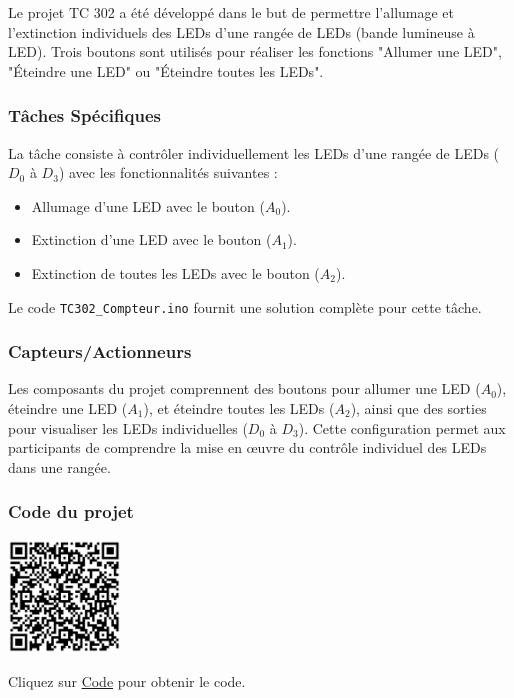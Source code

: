 \documentclass[a4paper,12pt]{report}
\begin{document}
Le projet TC 302 a été développé dans le but de permettre l'allumage et l'extinction individuels des LEDs d'une rangée de LEDs (bande lumineuse à LED). Trois boutons sont utilisés pour réaliser les fonctions "Allumer une LED", "Éteindre une LED" ou "Éteindre toutes les LEDs".

\subsubsection{Tâches Spécifiques}

La tâche consiste à contrôler individuellement les LEDs d'une rangée de LEDs (\(D_0\) à \(D_3\)) avec les fonctionnalités suivantes :
\begin{itemize}
    \item Allumage d'une LED avec le bouton (\(A_0\)).
    \item Extinction d'une LED avec le bouton (\(A_1\)).
    \item Extinction de toutes les LEDs avec le bouton (\(A_2\)).
\end{itemize}
Le code \texttt{TC302\_Compteur.ino} fournit une solution complète pour cette tâche.

\subsubsection{Capteurs/Actionneurs}

Les composants du projet comprennent des boutons pour allumer une LED (\(A_0\)), éteindre une LED (\(A_1\)), et éteindre toutes les LEDs (\(A_2\)), ainsi que des sorties pour visualiser les LEDs individuelles (\(D_0\) à \(D_3\)). Cette configuration permet aux participants de comprendre la mise en œuvre du contrôle individuel des LEDs dans une rangée.

\subsubsection{Code du projet}

\begin{minipage}{0.5\textwidth}
    \includegraphics[height=3cm]{Code TC202.png}
\end{minipage}%
\begin{minipage}{0.5\textwidth}
    Cliquez sur \href{https://github.com/DexterTaha/Controllino-PLC-Sample/blob/main/TC300/TC302_Compteur/TC302_Compteur.ino}{Code} pour obtenir le code.
\end{minipage}
\end{document}
